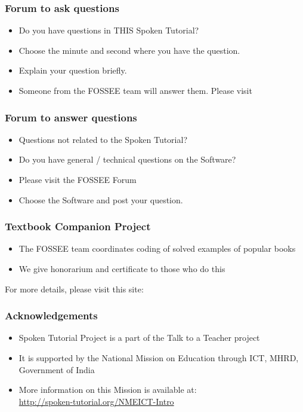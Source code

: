 \documentclass[17pt]{beamer}
\begin{document}
\begin{frame}
\frametitle{Forum to ask questions}
\begin{itemize}
\item Do you have questions in THIS Spoken Tutorial?
\item Choose the minute and second where you have the question.
\item Explain your question briefly.
\item Someone from the FOSSEE team will answer them. Please visit 
\end{itemize}
\begin{center}
{\color{blue}{http://forums.spoken-tutorial.org/}}
 \end{center} 
\end{frame}
\begin{frame}
\frametitle{Forum to answer questions}
\begin{itemize}
\item Questions not related to the Spoken Tutorial?
\item Do you have general / technical questions on the Software?
\item Please visit the FOSSEE Forum
\begin{center}
{\color{blue}{http://forums.fossee.in/}}
 \end{center}
\item Choose the Software and post your question.
\end{itemize}
\end{frame}
\begin{frame}
\frametitle{Textbook Companion Project}
\begin{itemize}
\item The FOSSEE team coordinates coding of solved examples of popular
  books 
\item We give honorarium and certificate to those who do this
\end{itemize}
For more details, please visit this site:
\begin{center}
{\color{blue}{http://tbc-python.fossee.in/}}
\end{center}
\end{frame}
\begin{frame}
\frametitle{Acknowledgements}
\begin{itemize}
\item Spoken Tutorial Project is a part of the Talk to a Teacher  project 
\item It is supported by the National Mission on Education through  ICT, MHRD, Government of India 
\item More information on this Mission is available at: \\{\color{blue}\url{http://spoken-tutorial.org/NMEICT-Intro}}
\end{itemize}
\end{frame}
\end{document}

